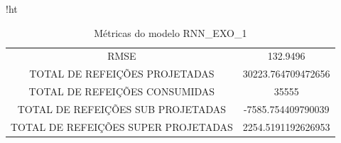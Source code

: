 \documentclass[	12pt, Times, openright, twoside, a4paper, english, brazil]{abntex2}
\begin{document}
                \begin{figure}[H]
                \end{figure}
                
                \begin{table}{!ht}
                \centering
                \caption{Métricas do modelo  RNN\_EXO\_1 }
                \begin{tabular}{|c|c|}
                \rowcolor{gray!50}
                \hline
                \multicolumn{2}{c}{METRICAS DO MODELO RNN\_EXO\_1 :}\\ \hline
                RMSE & 132.9496\\
                TOTAL DE REFEIÇÕES PROJETADAS & 30223.764709472656\\
                TOTAL DE REFEIÇÕES CONSUMIDAS & 35555\\
                TOTAL DE REFEIÇÕES SUB PROJETADAS & -7585.754409790039\\
                TOTAL DE REFEIÇÕES SUPER PROJETADAS & 2254.5191192626953\\
                \hline \end{tabular} \end{table}
\end{document}
